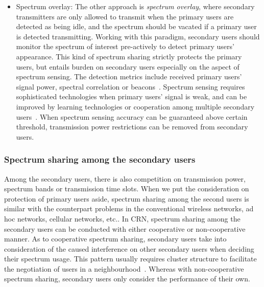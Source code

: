 \begin{itemize}
\item \label{overlay} Spectrum overlay:
The other approach is \textit{spectrum overlay}, where secondary transmitters are only allowed to transmit when the primary users are detected as being idle, and the spectrum should be vacated if a primary user is detected transmitting.
Working with this paradigm, secondary users should monitor the spectrum of interest pre-actively to detect primary users' appearance.
This kind of spectrum sharing strictly protects the primary users, but entails burden on secondary users especially on the aspect of spectrum sensing.
The detection metrics include received primary users' signal power, spectral correlation or beacons~\cite{crnsensing_09}.
Spectrum sensing requires sophisticated technologies when primary users' signal is weak, and can be improved by learning technologies or cooperation among multiple secondary users~\cite{coorperativeSensing_Akyildiz11}.
When spectrum sensing accuracy can be guaranteed above certain threshold, transmission power restrictions can be removed from  secondary users.


\end{itemize}



\subsubsection*{Spectrum sharing among the secondary users}
Among the secondary users, there is also competition on transmission power, spectrum bands or transmission time slots.
When we put the consideration on protection of primary users aside, spectrum sharing among the second users is similar with the counterpart problems in the conventional wireless networks, \ie ad hoc networks, cellular networks, etc..
In CRN, spectrum sharing among the secondary users can be conducted with either cooperative or non-cooperative manner.
As to cooperative spectrum sharing, secondary users take into consideration of the caused interference on other secondary users when deciding their spectrum usage.
This pattern usually requires cluster structure to facilitate the negotiation of users in a neighbourhood~\cite{Chen07}.
Whereas with non-cooperative spectrum sharing, secondary users only consider the performance of their own.









